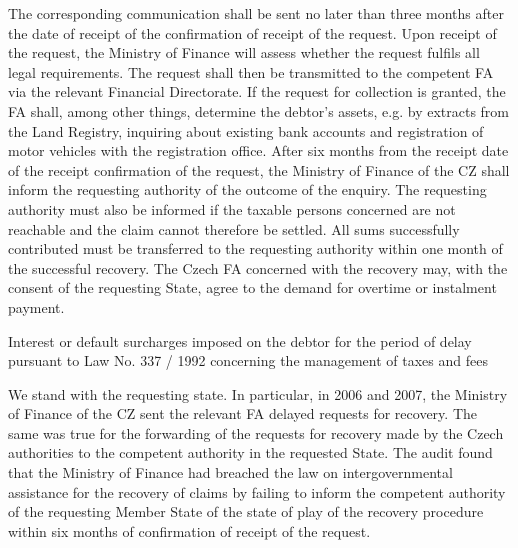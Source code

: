 \documentclass[10pt]{article}
\begin{document}
The corresponding communication shall be sent no later than three months after the date of receipt of the confirmation of receipt of the request.
Upon receipt of the request, the Ministry of Finance will assess whether the request fulfils all legal requirements.
The request shall then be transmitted to the competent FA via the relevant Financial Directorate. If the request for collection is granted, the FA shall, among other things, determine the debtor's assets, e.g. by extracts from the Land Registry, inquiring about existing bank accounts and registration of motor vehicles with the registration office.
After six months from the receipt date of the receipt confirmation of the request, the Ministry of Finance of the CZ shall inform the requesting authority of the outcome of the enquiry.
The requesting authority must also be informed if the taxable persons concerned are not reachable and the claim cannot therefore be settled.
All sums successfully contributed must be transferred to the requesting authority within one month of the successful recovery.
The Czech FA concerned with the recovery may, with the consent of the requesting State, agree to the demand for overtime or instalment payment.


Interest or default surcharges imposed on the debtor for the period of delay pursuant to Law No. 337 / 1992 concerning the management of taxes and fees

We stand with the requesting state.
In particular, in 2006 and 2007, the Ministry of Finance of the CZ sent the relevant FA delayed requests for recovery.
The same was true for the forwarding of the requests for recovery made by the Czech authorities to the competent authority in the requested State.
The audit found that the Ministry of Finance had breached the law on intergovernmental assistance for the recovery of claims by failing to inform the competent authority of the requesting Member State of the state of play of the recovery procedure within six months of confirmation of receipt of the request.
\end{document}
